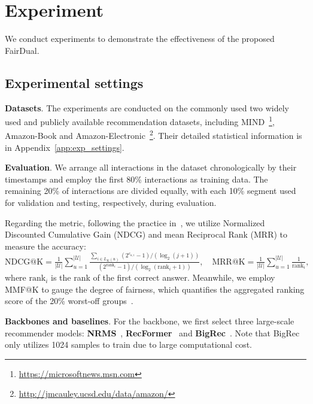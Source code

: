 \section{Experiment}
We conduct experiments to demonstrate the effectiveness of the proposed FairDual.





\subsection{Experimental settings}\label{sec:exp_settings}

\textbf{Datasets}. The experiments are conducted on the commonly used two widely used and publicly available recommendation datasets, including MIND~\citep{wu2020mind}\footnote{\url{https://microsoftnews.msn.com}},
Amazon-Book and Amazon-Electronic~\citep{he2016ups}\footnote{\url{http://jmcauley.ucsd.edu/data/amazon/}}. Their detailed statistical information is in Appendix~\ref{app:exp_settings}.


\textbf{Evaluation}. We arrange all interactions in the dataset chronologically by their timestamps and employ the first 80\% interactions as training data. The remaining 20\% of interactions are divided equally, with each 10\% segment used for validation and testing, respectively, during evaluation.


Regarding the metric, following the practice in~\cite{dai23Uncover}, we utilize Normalized Discounted Cumulative Gain (NDCG) and mean Reciprocal Rank (MRR) to measure the accuracy:
$
    \text{NDCG@K} = \frac{1}{|\mathcal{U}|}\sum_{u=1}^{|\mathcal{U}|}\frac{\sum_{i\in L_K(u)} (2^{c_{u,i}}-1)/(\log_2(j+1))}{(2^{\text{rank}_i}-1)/(\log_2(\text{rank}_i+1))}, \quad \text{MRR@K} = \frac{1}{|\mathcal{U}|}\sum_{u=1}^{|\mathcal{U}|}\frac{1}{\text{rank}_i},
$
where $\text{rank}_i$ is the rank of the first correct answer. Meanwhile, we employ MMF@K to gauge the degree of fairness, which quantifies the aggregated ranking score of the 20\% worst-off groups~\citep{nips21welf, xu2023p}.

\textbf{Backbones and baselines}. For the backbone, we first select three large-scale recommender models: \textbf{NRMS}~\citep{wu-etal-2019-neural-news},  \textbf{RecFormer}~\citep{Recformer} and \textbf{BigRec}~\citep{bao2023bi}. Note that BigRec only utilizes 1024 samples to train due to large computational cost. 



